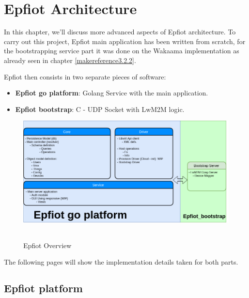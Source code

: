 
\cleardoublepage

\chapter{Epfiot Architecture}
\label{makereference4}

In this chapter, we'll discuss more advanced aspects of Epfiot architecture. To carry out this project, Epfiot main application has been written from scratch, for the bootstrapping service part it was done on the Wakaama implementation as already seen in chapter \ref{makereference3.2.2}.

Epfiot then consists in two separate pieces of software:
\begin{itemize}
    \item \textbf{Epfiot go platform}: Golang Service with the main application.
    \item \textbf{Epfiot bootstrap}:  C - UDP Socket with LwM2M logic.
\end{itemize}

\begin{figure}[h!]%
\centering
    \includegraphics[width=5.5in]{figures/Application.png}
~\caption{Epfiot Overview}
\label{figure4.1}
\end{figure}
The following pages will show the implementation details taken for both parts.



\section{Epfiot platform}
\label{makereference4.2}

